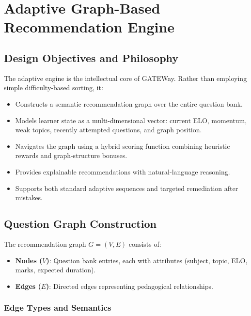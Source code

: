 \documentclass[sigconf,authordraft,twoside]{acmart}
\newcommand{\project}{GATEWay}
\begin{document}
\section{Adaptive Graph-Based Recommendation Engine} \label{sec:adaptive}

\subsection{Design Objectives and Philosophy}
The adaptive engine is the intellectual core of \project{}. Rather than employing simple difficulty-based sorting, it:

\begin{itemize}
\item Constructs a semantic recommendation graph over the entire question bank.
\item Models learner state as a multi-dimensional vector: current ELO, momentum, weak topics, recently attempted questions, and graph position.
\item Navigates the graph using a hybrid scoring function combining heuristic rewards and graph-structure bonuses.
\item Provides explainable recommendations with natural-language reasoning.
\item Supports both standard adaptive sequences and targeted remediation after mistakes.
\end{itemize}

\subsection{Question Graph Construction}

The recommendation graph $G = (V, E)$ consists of:

\begin{itemize}
\item \textbf{Nodes ($V$)}: Question bank entries, each with attributes (subject, topic, ELO, marks, expected duration).
\item \textbf{Edges ($E$)}: Directed edges representing pedagogical relationships.
\end{itemize}

\subsubsection{Edge Types and Semantics}
\end{document}
